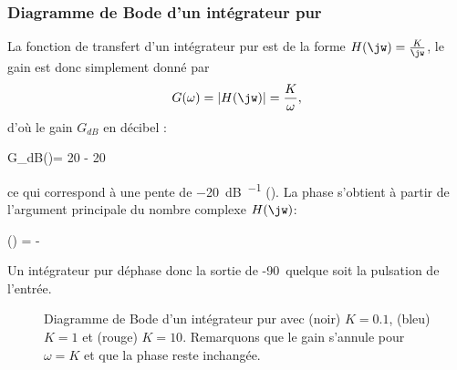 \subsubsection{Diagramme de Bode d'un intégrateur pur}
La fonction de transfert d'un intégrateur pur est de la forme 
$H(\jw)=\frac{K}{\jw}$, le gain est donc simplement donné par 
\[
G(\omega)=|H(\jw)|=\frac{K}{\omega},
\] 
d'où le gain $G_{dB}$ en décibel :
\begin{bequation}
G_{dB}(\omega)= 20 - 20\log{\omega}
\end{bequation} 
ce qui correspond à une pente de \SI{-20}{\dB\per\dec} ().
La phase s'obtient à partir de l'argument principale 
du nombre complexe $H(\jw)$:
\begin{bequation}
\phi(\omega) = -
\end{bequation}
Un intégrateur pur déphase donc la sortie de -90\degree~quelque soit la 
pulsation de l'entrée.
\begin{figure}[!htb]
    \centering
    

    
    \caption{Diagramme de Bode d'un intégrateur pur avec (noir) 
             $K=0.1$, (bleu) $K=1$ et (rouge) $K=10$. Remarquons 
             que le gain s'annule pour $\omega=K$ et que la phase reste 
             inchangée.\label{fig-bode_int}}
\end{figure}
\newpage
